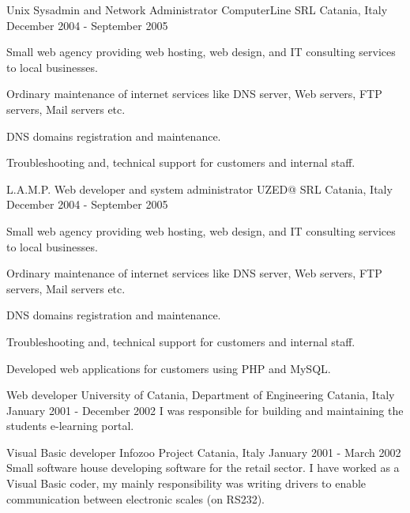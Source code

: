 \begin{cventries}
  \cventry
  {Unix Sysadmin and Network Administrator}
  {ComputerLine SRL}
  {Catania, Italy}
  {December 2004 - September 2005}
  {
    Small web agency providing web hosting, web design, and IT consulting services to local businesses.
    \begin{cvitems}
      \item Ordinary maintenance of internet services like DNS server, Web servers, FTP servers, Mail servers etc.
      \item DNS domains registration and maintenance.
      \item Troubleshooting and, technical support for customers and internal staff.
    \end{cvitems}
  }

  \cventry
  {L.A.M.P. Web developer and system administrator}
  {UZED@ SRL}
  {Catania, Italy}
  {December 2004 - September 2005}
  {
    Small web agency providing web hosting, web design, and IT consulting services to local businesses.
    \begin{cvitems}
      \item Ordinary maintenance of internet services like DNS server, Web servers, FTP servers, Mail servers etc.
      \item DNS domains registration and maintenance.
      \item Troubleshooting and, technical support for customers and internal staff.
      \item Developed web applications for customers using PHP and MySQL.
    \end{cvitems}
  }

  \cventry
  {Web developer}
  {University of Catania, Department of Engineering}
  {Catania, Italy}
  {January 2001 - December 2002}
  {
    I was responsible for building and maintaining the students e-learning portal.
  }

  \cventry
  {Visual Basic developer}
  {Infozoo Project}
  {Catania, Italy}
  {January 2001 - March 2002}
  {
    Small software house developing software for the retail sector.
    I have worked as a Visual Basic coder, my mainly responsibility was writing drivers to enable
    communication between electronic scales (on RS232).
  }

\end{cventries}
